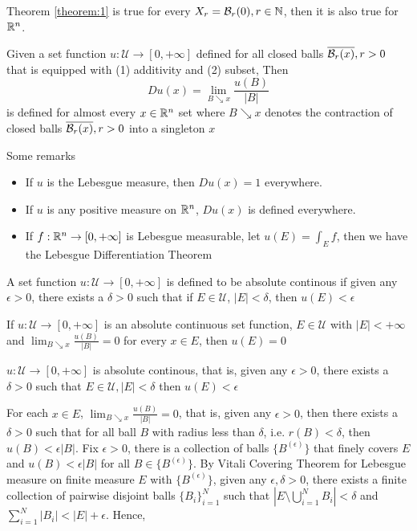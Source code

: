 \documentclass{article}
\begin{document}
Theorem \ref{theorem:1} is true for every $X_r = \mathcal{B}_r(0), r \in \mathbb{N}$, then it is also true for $\mathbb{R}^n$.

\begin{corollary}
    Given a set function $u: \mathcal{U} \to [0, +\infty]$ defined for all closed balls $\overline{\mathcal{B}_r(x)}, r > 0$ that is equipped with (1) additivity and (2) subset, Then
    \[
        Du(x) = \lim_{B \searrow x} \frac{u(B)}{|B|} 
    \]
    is defined for almost every $x \in \mathbb{R}^n$ set where $B \searrow x$ denotes the contraction of closed balls $\overline{\mathcal{B}_r(x)}, r > 0$ into a singleton $x$
\end{corollary}

\begin{remark}
    Some remarks
    \begin{itemize}
        \item If $u$ is the Lebesgue measure, then $Du(x) = 1$ everywhere.
        \item If $u$ is any positive measure on $\mathbb{R}^n$, $Du(x)$ is defined everywhere.
        \item If $f: \mathbb{R}^n \to [0, +\infty]$ is Lebesgue measurable, let $u(E) = \int_E f$, then we have the Lebesgue Differentiation Theorem
    \end{itemize}
\end{remark}

\begin{definition}
    A set function $u: \mathcal{U} \to [0, +\infty]$ is defined to be absolute continous if given any $\epsilon > 0$, there exists a $\delta > 0$ such that if $E \in \mathcal{U}$, $|E| < \delta$, then $u(E) < \epsilon$
\end{definition}

\begin{lemma}[Theorem 7.28]
    If $u: \mathcal{U} \to [0, +\infty]$ is an absolute continuous set function, $E \in \mathcal{U}$ with $|E| < +\infty$ and $\lim_{B \searrow x} \frac{u(B)}{|B|} = 0$ for every $x \in E$, then $u(E) = 0$
\end{lemma}

$u: \mathcal{U} \to [0, +\infty]$ is absolute continous, that is, given any $\epsilon > 0$, there exists a $\delta > 0$ such that $E \in \mathcal{U}, |E| < \delta$ then $u(E) < \epsilon$

For each $x \in E$, $\lim_{B \searrow x} \frac{u(B)}{|B|} = 0$, that is, given any $\epsilon > 0$, then there exists a $\delta > 0$ such that for all ball $B$ with radius less than $\delta$, i.e. $r(B) < \delta$, then $u(B) < \epsilon |B|$. Fix $\epsilon > 0$, there is a collection of balls $\{B^{(\epsilon)} \}$ that finely covers $E$ and $u(B) < \epsilon |B|$ for all $B \in \{B^{(\epsilon)} \}$. By Vitali Covering Theorem for Lebesgue measure on finite measure $E$ with $\{B^{(\epsilon)} \}$, given any $\epsilon, \delta > 0$, there exists a finite collection of pairwise disjoint balls $\{B_i \}_{i=1}^N$ such that $|E \setminus \bigcup_{i=1}^N B_i| < \delta$ and $\sum_{i=1}^N |B_i| < |E| + \epsilon$. Hence,
\end{document}
